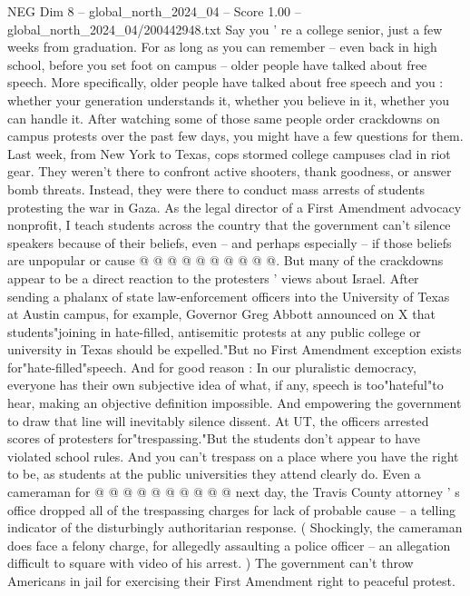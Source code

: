 \begin{textsample}{NEG Dim 8 – global\_north\_2024\_04 – Score 1.00 – global\_north\_2024\_04/200442948.txt}  \label{ex:f8_neg_408}
Say you ' re a college senior, just a few weeks from graduation.
For as long as you can remember -- even back in high school, before you set foot on campus -- older people have talked about free speech.
More specifically, older people have talked about free speech and you : whether your generation understands it, whether you believe in it, whether you can handle it.
After watching some of those same people order crackdowns on campus protests over the past few days, you might have a few questions for them.
Last week, from New York to Texas, cops stormed college campuses clad in riot gear.
They weren't there to confront active shooters, thank goodness, or answer bomb threats.
Instead, they were there to conduct mass arrests of students protesting the war in Gaza.
As the legal director of a First Amendment advocacy nonprofit, I teach students across the country that the government can't silence speakers because of their beliefs, even -- and perhaps especially -- if those beliefs are unpopular or cause @ @ @ @ @ @ @ @ @ @.
But many of the crackdowns appear to be a direct reaction to the protesters ' views about Israel.
After sending a phalanx of state law-enforcement officers into the University of Texas at Austin campus, for example, Governor Greg Abbott announced on X that students"joining in hate-filled, antisemitic protests at any public college or university in Texas should be expelled."But no First Amendment exception exists for"hate-filled"speech.
And for good reason : In our pluralistic democracy, everyone has their own subjective idea of what, if any, speech is too"hateful"to hear, making an objective definition impossible.
And empowering the government to draw that line will inevitably silence dissent.
At UT, the officers arrested scores of protesters for"trespassing."But the students don't appear to have violated school rules.
And you can't trespass on a place where you have the right to be, as students at the public universities they attend clearly do.
Even a cameraman for @ @ @ @ @ @ @ @ @ @ next day, the Travis County attorney ' s office dropped all of the trespassing charges for lack of probable cause -- a telling indicator of the disturbingly authoritarian response. ( Shockingly, the cameraman does face a felony charge, for allegedly assaulting a police officer -- an allegation difficult to square with video of his arrest. ) The government can't throw Americans in jail for exercising their First Amendment right to peaceful protest.

\end{textsample}
